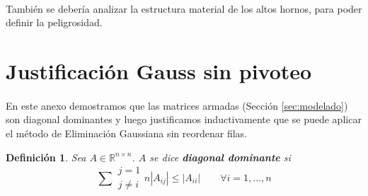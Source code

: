 \documentclass[12pt]{article}
\newtheorem{defi}{Definición}
\begin{document}
\paragraph{} También se debería analizar la estructura material de los altos hornos, para poder definir la peligrosidad.

\pagebreak
\appendix 

\renewcommand{\thesection}{\Roman{section}}

\section{Justificación Gauss sin pivoteo} 
\label{appendix:justificacion}

\paragraph{} En este anexo demostramos que las matrices armadas (Sección \ref{sec:modelado}) son diagonal dominantes y luego justificamos inductivamente que se puede aplicar el método de Eliminación Gaussiana sin reordenar filas.

\begin{defi}
Sea \(A \in \mathbb{R}^{n \times n}\). \(A\) se dice \textbf{diagonal dominante} si 
\[
  \sum{\substack{j = 1 \\ j \neq i}}{n}|A_{ij}| \leq  |A_{ii}| \qquad \forall i = 1, ..., n
\]
\end{defi}
\end{document}
